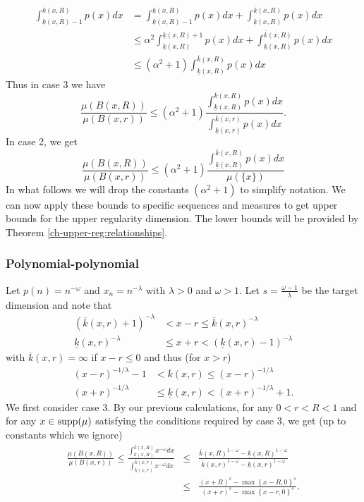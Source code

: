 \begin{align*}
\int_{\underline{k}(x,R)-1}^{\overline{k}(x,R)} p(x)dx &=\int_{\underline{k}(x,R)-1}^{\underline{k}(x,R)} p(x)dx + \int_{\underline{k}(x,R)}^{\overline{k}(x,R)} p(x)dx \\
&\le \alpha^2\int_{\underline{k}(x,R)}^{\underline{k}(x,R)+1} p(x)dx + \int_{\underline{k}(x,R)}^{\overline{k}(x,R)} p(x)dx \\
&\le (\alpha^2+1) \int_{\underline{k}(x,R)}^{\overline{k}(x,R)} p(x)dx 
\end{align*}
Thus in case 3 we have 
\[
\frac{\mu(B(x,R))}{\mu(B(x,r))} \le (\alpha^2+1) \frac{\int_{\underline{k}(x,R)}^{\overline{k}(x,R)} p(x)dx}{\int_{\underline{k}(x,r)}^{\overline{k}(x,r)} p(x)dx}.
\]
In case 2, we get 
\[
\frac{\mu(B(x,R))}{\mu(B(x,r))} \le (\alpha^2+1)  \frac{\int_{\underline{k}(x,R)}^{\overline{k}(x,R)} p(x)dx}{\mu(\{x\})}
\]
In what follows we will drop the constants $(\alpha^2+1) $ to simplify notation.  We can now apply these bounds to specific sequences and measures to get upper bounds for the upper regularity dimension.  The lower bounds will be provided by Theorem \ref{ch-upper-reg:relationships}.

\subsubsection{Polynomial-polynomial}

Let $p(n)=n^{-\omega}$ and $x_n=n^{-\lambda}$ with $\lambda>0$ and $\omega>1$.  Let $s=\frac{\omega-1}{\lambda}$ be the target dimension and note that
\begin{align*}
(\overline{k}(x,r)+1)^{-\lambda}&<x-r\le \overline{k}(x,r)^{-\lambda} \\
\underline{k}(x,r)^{-\lambda}&\le x+r< (\underline{k}(x,r)-1)^{-\lambda} 
\end{align*}
with $\overline{k}(x,r) = \infty$ if $x-r\le 0$ and thus (for $x > r$)
\begin{align*}
(x-r)^{-1/\lambda}-1 &< \overline{k}(x,r) \le (x-r)^{-1/\lambda} \\
(x+r)^{-1/\lambda} &\le \underline{k}(x,r) < (x+r)^{-1/\lambda}+1.
\end{align*}
We first consider case 3. By our previous calculations, for any $0<r<R<1$ and for any $x\in \textup{supp}(\mu)$ satisfying the conditions required by case 3, we get (up to constants which we ignore)
\begin{eqnarray*}
	\frac{\mu(B(x,R))}{\mu(B(x,r))} \le \frac{\int_{\underline{k}(x,R)}^{\overline{k}(x,R)} x^{-\omega}dx}{\int_{\underline{k}(x,r)}^{\overline{k}(x,r)} x^{-\omega}dx} &\le& \frac{\overline{k}(x,R)^{1-\omega}-\underline{k}(x,R)^{1-\omega}}{\overline{k}(x,r)^{1-\omega}-\underline{k}(x,r)^{1-\omega}} \\ 
	& \le & \frac{(x+R)^{s}-\max\left\{ x-R,0\right\}^{s}}{(x+r)^{s}-\max\left\{x-r,0\right\}^s}.
\end{eqnarray*}



